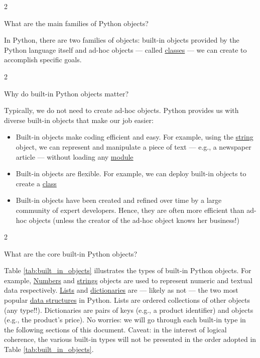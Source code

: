 \documentclass[a4paper,11pt]{book}
\newcommand{\question}[1]{%
    \begin{tcolorbox}[colback=comp_c!10,colframe=comp_c,sidebyside align=top,width=\linewidth,before skip=1ex]
        #1
    \end{tcolorbox}
    \switchcolumn%
}
\newcommand{\note}[1]{%
    \begin{tcolorbox}[colback=white!0,colframe=white!10,width=\linewidth,before skip=1ex]
        #1
    \end{tcolorbox}
}
\begin{document}
\begin{paracol}{2}
    \question{\raggedright What are the main families of Python objects?}
    \note{In Python, there are two families of objects: built-in objects provided by the Python language itself and ad-hoc objects --- called \href{https://docs.python.org/3/tutorial/classes.html}{classes} --- we can create to accomplish specific goals.}
\end{paracol}
\clearpage

\begin{paracol}{2}
    \question{\raggedright Why do built-in Python objects matter?} 
    \note{
    Typically, we do not need to create ad-hoc objects. Python provides us with diverse built-in objects that make our job easier:
    \begin{itemize}
    	\item Built-in objects make coding efficient and easy. For example, using the \href{https://docs.python.org/3/tutorial/introduction.html\#strings}{string} object, we can represent and manipulate a piece of text --- e.g., a newspaper article --- without loading any \href{https://docs.python.org/3/tutorial/modules.html}{module}
    	\item Built-in objects are flexible. For example, we can deploy built-in objects to create a \href{https://docs.python.org/3/tutorial/classes.html}{class}
    	\item Built-in objects have been created and refined over time by a large community of expert developers. Hence, they are  often  more  efficient  than  ad-hoc objects (unless the creator of the ad-hoc object knows her business!)
    \end{itemize}
    }
\end{paracol}

\begin{paracol}{2}
    \question{\raggedright What are the core built-in Python objects?} 
	\note{Table \ref{tab:built_in_objects} illustrates the types of built-in Python objects. For example, \href{https://docs.python.org/3/tutorial/introduction.html\#numbers}{Numbers} and \href{https://docs.python.org/3/tutorial/introduction.html\#strings}{strings} objects are used to represent numeric and textual data respectively. \href{https://docs.python.org/3/tutorial/introduction.html\#lists}{Lists} and \href{https://docs.python.org/3/tutorial/datastructures.html\#dictionaries}{dictionaries} are --- likely as not --- the two most popular \href{https://docs.python.org/3/tutorial/datastructures.html}{data structures} in Python. Lists are ordered collections of other objects (any type!!). Dictionaries are pairs of keys (e.g., a product identifier) and objects (e.g., the product's price). No worries: we will go through each built-in type in the following sections of this document. Caveat: in the interest of logical coherence, the various built-in types will not be presented in the order adopted in Table \ref{tab:built_in_objects}.} 
\end{paracol}
\end{document}
